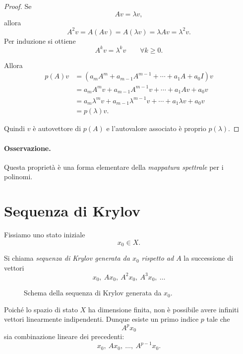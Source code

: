 \begin{proof}
Se
\[
Av=\lambda v,
\]
allora
\[
A^2v=A(Av)=A(\lambda v)=\lambda Av=\lambda^2 v.
\]
Per induzione si ottiene
\[
A^kv=\lambda^k v\qquad \forall k\ge 0.
\]

Allora
\begin{align*}
p(A)v
&=
(a_mA^m+a_{m-1}A^{m-1}+\cdots+a_1A+a_0I)v\\
&=
a_mA^mv+a_{m-1}A^{m-1}v+\cdots+a_1Av+a_0v\\
&=
a_m\lambda^m v+a_{m-1}\lambda^{m-1}v+\cdots+a_1\lambda v+a_0v\\
&=
p(\lambda)v.
\end{align*}

Quindi $v$ è autovettore di $p(A)$ e l'autovalore associato è proprio $p(\lambda)$.
\end{proof}

\paragraph{Osservazione.}
Questa proprietà è una forma elementare della \emph{mappatura spettrale} per i polinomi.

\section{Sequenza di Krylov}

Fissiamo uno stato iniziale
\[
x_0\in X.
\]

Si chiama \emph{sequenza di Krylov generata da $x_0$ rispetto ad $A$} la successione di vettori
\begin{equation}
x_0,\ Ax_0,\ A^2x_0,\ A^3x_0,\ \dots
\label{eq:L5_krylov_sequence}
\end{equation}

\begin{figure}[H]
\centering
{}
\caption{Schema della sequenza di Krylov generata da $x_0$.}
\end{figure}

Poiché lo spazio di stato $X$ ha dimensione finita, non è possibile avere infiniti vettori linearmente indipendenti.  
Dunque esiste un primo indice $p$ tale che
\[
A^p x_0
\]
sia combinazione lineare dei precedenti:
\[
x_0,\ Ax_0,\ \dots,\ A^{p-1}x_0.
\]

